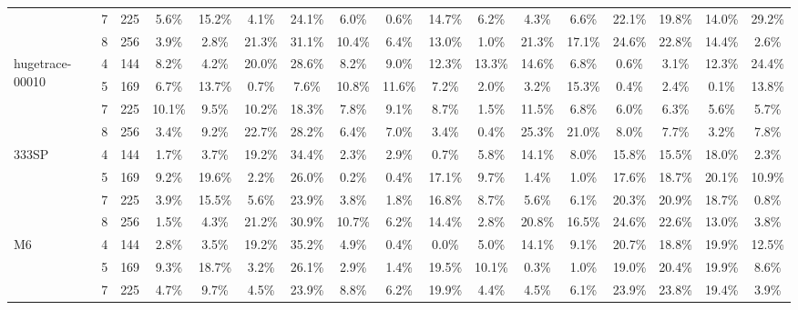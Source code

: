 \begin{tabular}[c]{| l | c | c | c | c | c | c | c | c | c | c | c | c | c | c | c | c |}
 & 7 & 225 & 5.6\%  & 15.2\%  & 4.1\%  & 24.1\%  & 6.0\%  & 0.6\%  & 14.7\%  & 6.2\%  & 4.3\%  & 6.6\%  & 22.1\%  & 19.8\%  & 14.0\%  & 29.2\%   \\ \cline{2-17}
 & 8 & 256 & 3.9\%  & 2.8\%  & 21.3\%  & 31.1\%  & 10.4\%  & 6.4\%  & 13.0\%  & 1.0\%  & 21.3\%  & 17.1\%  & 24.6\%  & 22.8\%  & 14.4\%  & 2.6\%   \\ \hline
\multirow{4}{*}{hugetrace-00010}  & 4 & 144 & 8.2\%  & 4.2\%  & 20.0\%  & 28.6\%  & 8.2\%  & 9.0\%  & 12.3\%  & 13.3\%  & 14.6\%  & 6.8\%  & 0.6\%  & 3.1\%  & 12.3\%  & 24.4\%   \\ \cline{2-17}
 & 5 & 169 & 6.7\%  & 13.7\%  & 0.7\%  & 7.6\%  & 10.8\%  & 11.6\%  & 7.2\%  & 2.0\%  & 3.2\%  & 15.3\%  & 0.4\%  & 2.4\%  & 0.1\%  & 13.8\%   \\ \cline{2-17}
 & 7 & 225 & 10.1\%  & 9.5\%  & 10.2\%  & 18.3\%  & 7.8\%  & 9.1\%  & 8.7\%  & 1.5\%  & 11.5\%  & 6.8\%  & 6.0\%  & 6.3\%  & 5.6\%  & 5.7\%   \\ \cline{2-17}
 & 8 & 256 & 3.4\%  & 9.2\%  & 22.7\%  & 28.2\%  & 6.4\%  & 7.0\%  & 3.4\%  & 0.4\%  & 25.3\%  & 21.0\%  & 8.0\%  & 7.7\%  & 3.2\%  & 7.8\%   \\ \hline
\multirow{4}{*}{333SP}  & 4 & 144 & 1.7\%  & 3.7\%  & 19.2\%  & 34.4\%  & 2.3\%  & 2.9\%  & 0.7\%  & 5.8\%  & 14.1\%  & 8.0\%  & 15.8\%  & 15.5\%  & 18.0\%  & 2.3\%   \\ \cline{2-17}
 & 5 & 169 & 9.2\%  & 19.6\%  & 2.2\%  & 26.0\%  & 0.2\%  & 0.4\%  & 17.1\%  & 9.7\%  & 1.4\%  & 1.0\%  & 17.6\%  & 18.7\%  & 20.1\%  & 10.9\%   \\ \cline{2-17}
 & 7 & 225 & 3.9\%  & 15.5\%  & 5.6\%  & 23.9\%  & 3.8\%  & 1.8\%  & 16.8\%  & 8.7\%  & 5.6\%  & 6.1\%  & 20.3\%  & 20.9\%  & 18.7\%  & 0.8\%   \\ \cline{2-17}
 & 8 & 256 & 1.5\%  & 4.3\%  & 21.2\%  & 30.9\%  & 10.7\%  & 6.2\%  & 14.4\%  & 2.8\%  & 20.8\%  & 16.5\%  & 24.6\%  & 22.6\%  & 13.0\%  & 3.8\%   \\ \hline
\multirow{4}{*}{M6}  & 4 & 144 & 2.8\%  & 3.5\%  & 19.2\%  & 35.2\%  & 4.9\%  & 0.4\%  & 0.0\%  & 5.0\%  & 14.1\%  & 9.1\%  & 20.7\%  & 18.8\%  & 19.9\%  & 12.5\%   \\ \cline{2-17}
 & 5 & 169 & 9.3\%  & 18.7\%  & 3.2\%  & 26.1\%  & 2.9\%  & 1.4\%  & 19.5\%  & 10.1\%  & 0.3\%  & 1.0\%  & 19.0\%  & 20.4\%  & 19.9\%  & 8.6\%   \\ \cline{2-17}
 & 7 & 225 & 4.7\%  & 9.7\%  & 4.5\%  & 23.9\%  & 8.8\%  & 6.2\%  & 19.9\%  & 4.4\%  & 4.5\%  & 6.1\%  & 23.9\%  & 23.8\%  & 19.4\%  & 3.9\%   \\ \cline{2-17}

\end{tabular}
